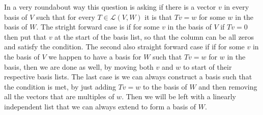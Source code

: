 \documentclass[10pt, twocolumn]{article}
\newcommand{\LinearMap}[2]{\mathcal{L}(#1, #2)}
\begin{document}
\begin{q}[4]
    In a very roundabout way this question is asking if there is a vector $ v $  in every basis of $ V $ such that for every 
    $ T \in \LinearMap{V}{W} $ it is that $ Tv = w $ for some $ w $ in the basis of $ W $. 
    The stright forward case is if for some $ v $ in the basis of $ V $ if $ Tv = 0 $ then put that $ v $ at the start of the basis list, so that the column can be all zeros and satisfy the condition.
    The second also straight forward case if if for some $ v $ in the basis of $ V $ we happen to have a basis for $ W $ such that $ Tv = w $ for $ w $ in the basis, then we are done as well, by moving both $ v $ and $ w $ to start of their respective basis lists.
    The last case is we can always construct a basis such that the condition is met, by just adding $ Tv = w $ to the basis of $ W $ and then removing all the vectors that are multiples of $ w $. 
    Then we will be left with a linearly independent list that we can always extend to form a basis of $ W $. 
\end{q}
\end{document}
